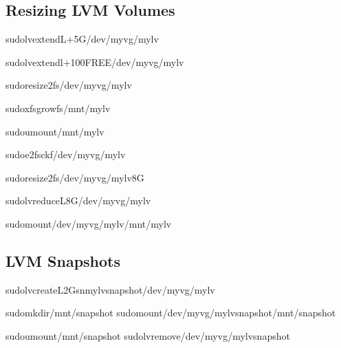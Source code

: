 \documentclass[letterpaper,10pt,english]{sphinxmanual}
\begin{document}
\subsection{Resizing LVM Volumes}
\label{\detokenize{volume-management:resizing-lvm-volumes}}
\sphinxAtStartPar
{}

\begin{sphinxVerbatim}[commandchars=\\\{\}]
sudolvextend\PYGZhy{}L+5G/dev/myvg/mylv

sudolvextend\PYGZhy{}l+100\PYGZpc{}FREE/dev/myvg/mylv

sudoresize2fs/dev/myvg/mylv

sudoxfs\PYGZus{}growfs/mnt/mylv
\end{sphinxVerbatim}

\sphinxAtStartPar
{}

\begin{sphinxVerbatim}[commandchars=\\\{\}]
sudoumount/mnt/mylv

sudoe2fsck\PYGZhy{}f/dev/myvg/mylv

sudoresize2fs/dev/myvg/mylv8G

sudolvreduce\PYGZhy{}L8G/dev/myvg/mylv

sudomount/dev/myvg/mylv/mnt/mylv
\end{sphinxVerbatim}


\subsection{LVM Snapshots}
\label{\detokenize{volume-management:lvm-snapshots}}
\begin{sphinxVerbatim}[commandchars=\\\{\}]
sudolvcreate\PYGZhy{}L2G\PYGZhy{}s\PYGZhy{}nmylv\PYGZus{}snapshot/dev/myvg/mylv

sudomkdir/mnt/snapshot
sudomount/dev/myvg/mylv\PYGZus{}snapshot/mnt/snapshot

sudoumount/mnt/snapshot
sudolvremove/dev/myvg/mylv\PYGZus{}snapshot
\end{sphinxVerbatim}
\end{document}
